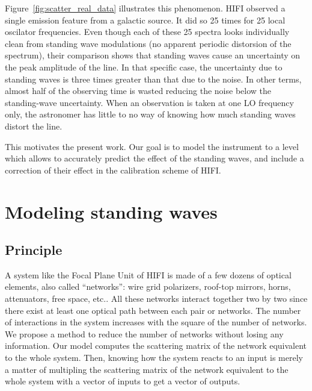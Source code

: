 \documentclass[a4paper,11pt]{article}
\begin{document}
Figure~\ref{fig:scatter_real_data} illustrates this phenomenon.
HIFI observed a single emission feature from a galactic source.
It did so 25 times for 25 local oscilator frequencies.
Even though each of these 25 spectra looks individually clean from standing wave modulations (no apparent periodic distorsion of the spectrum), their comparison shows that standing waves cause an uncertainty on the peak amplitude of the line.
In that specific case, the uncertainty due to standing waves is three times greater than that due to the noise.
In other terms, almost half of the observing time is wasted reducing the noise below the standing-wave uncertainty.
When an observation is taken at one LO frequency only, the astronomer has little to no way of knowing how much standing waves distort the line.

This motivates the present work.
Our goal is to model the instrument to a level which allows to accurately predict the effect of the standing waves, and include a correction of their effect in the calibration scheme of HIFI.






\section{Modeling standing waves}




\subsection{Principle}
A system like the Focal Plane Unit of HIFI is made of a few dozens of optical elements, also called ``networks'': wire grid polarizers, roof-top mirrors, horns, attenuators, free space, etc..
All these networks interact together two by two since there exist at least one optical path between each pair or networks.
The number of interactions in the system increases with the square of the number of networks.
We propose a method to reduce the number of networks without losing any information.
Our model computes the scattering matrix of the network equivalent to the whole system.
Then, knowing how the system reacts to an input is merely a matter of multipling the scattering matrix of the network equivalent to the whole system with a vector of inputs to get a vector of outputs.
\end{document}
